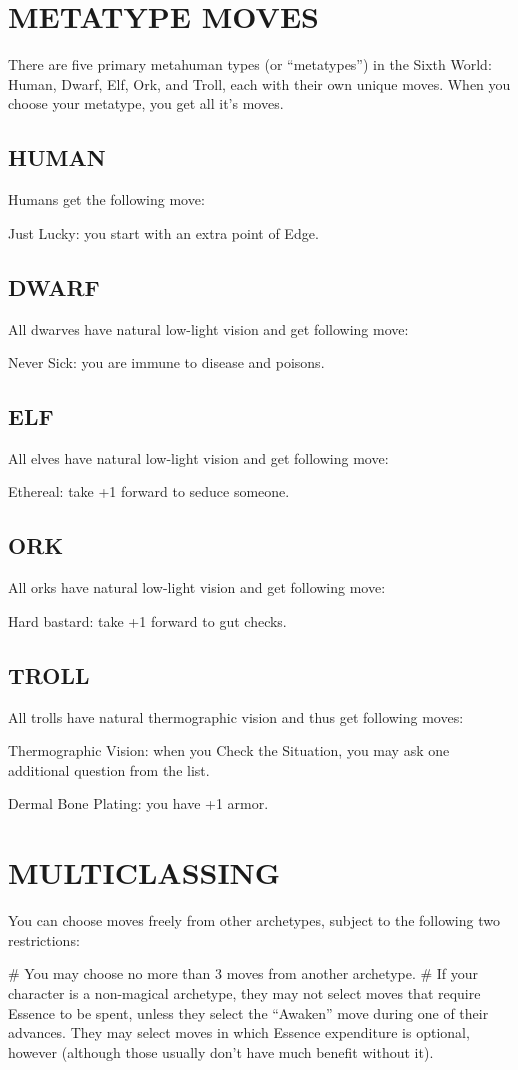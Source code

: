 \section{METATYPE MOVES}
There are five primary metahuman types (or “metatypes”) in the Sixth World: Human, Dwarf, Elf, Ork, and Troll, each with their own unique moves. When you choose your metatype, you get all it’s moves.

\subsection{HUMAN}
Humans get the following move:

Just Lucky: you start with an extra point of Edge.

\subsection{DWARF}
All dwarves have natural low-light vision and get following move:

Never Sick: you are immune to disease and poisons.

\subsection{ELF}
All elves have natural low-light vision and get following move:

Ethereal: take +1 forward to seduce someone.

\subsection{ORK}
All orks have natural low-light vision and get following move:

Hard bastard: take +1 forward to gut checks.

\subsection{TROLL}
All trolls have natural thermographic vision and thus get following moves:

Thermographic Vision: when you Check the Situation, you may ask one additional question from the list.

Dermal Bone Plating: you have +1 armor.

\section{MULTICLASSING}

You can choose moves freely from other archetypes, subject to the following two restrictions:

\begin{easylist}
# You may choose no more than 3 moves from another archetype.
# If your character is a non-magical archetype, they may not select moves that require Essence to be spent, unless they select the “Awaken” move during one of their advances. They may select moves in which Essence expenditure is optional, however (although those usually don’t have much benefit without it).
\end{easylist}
